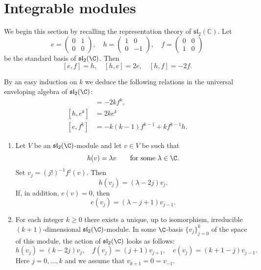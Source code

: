 \documentclass[12pt]{article}
\begin{document}
\section{Integrable modules}
We begin this section by recalling the representation theory of $\mathfrak{sl}_2(\mathbb{C})$. Let
\[
    e = \begin{pmatrix} 0 & 1 \\ 0 & 0 \end{pmatrix},
    \quad
    h = \begin{pmatrix} 1 & 0 \\ 0 & -1 \end{pmatrix},
    \quad
    f = \begin{pmatrix} 0 & 0 \\ 1 & 0 \end{pmatrix}
\]
be the standard basis of $\mathfrak{sl}_2(\C)$. Then
\[
    [e,f] = h,
    \quad [h,e] = 2e,
    \quad [h,f] = -2f.
\]

By an easy induction on $k$ we deduce the following relations in the universal enveloping algebra of $\mathfrak{sl}_2(\C)$:
\begin{align*}
    [h,f^k] & = -2k f^k,                       \\
    [h,e^k] & = 2k e^k                         \\
    [e,f^k] & = -k(k-1) f^{k-1} + k f^{k-1} h.
\end{align*}

\begin{lemma}\label{lem:sl2-modules}
    \leavevmode
    \begin{enumerate}[label=(\alph*)]
        \item Let $V$ be an $\mathfrak{sl}_2(\C)$-module and let $v \in V$ be such that
              \[
                  h(v) = \lambda v \qquad \text{for some } \lambda \in \C.
              \]
              Set $v_j = (j!)^{-1} f^j(v)$. Then
              \begin{equation}
                  h(v_j) = (\lambda - 2j) v_j. \tag{3.2.3}
              \end{equation}
              If, in addition, $e(v) = 0$, then
              \begin{equation}
                  e(v_j) = (\lambda - j + 1)v_{j-1}. \tag{3.2.4}
              \end{equation}

        \item For each integer $k \geq 0$ there exists a unique, up to isomorphism, irreducible $(k+1)$-dimensional $\mathfrak{sl}_2(\C)$-module. In some $\C$-basis $\{v_j\}_{j=0}^k$ of the space of this module, the action of $\mathfrak{sl}_2(\C)$ looks as follows:
              \[
                  h(v_j) = (k-2j)v_j,
                  \quad f(v_j) = (j+1)v_{j+1},
                  \quad e(v_j) = (k+1-j)v_{j-1}.
              \]
              Here $j=0,\dots,k$ and we assume that $v_{k+1}=0=v_{-1}$.
    \end{enumerate}
\end{lemma}
\end{document}
